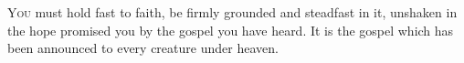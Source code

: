 
\lettrine{Y}{ou} must hold fast to faith, be firmly grounded and steadfast in it, unshaken in the hope promised you by the gospel you have heard. It is the gospel which has been announced to every creature under heaven.